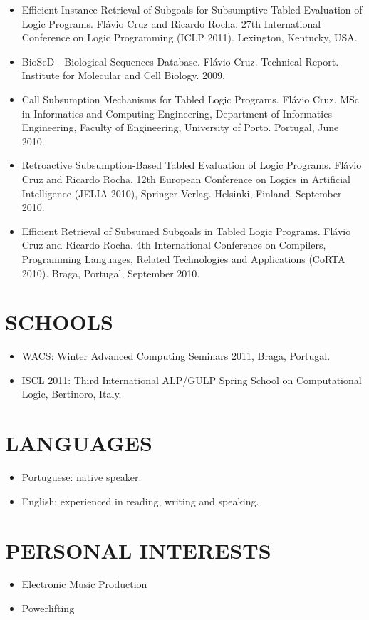 \documentclass[margin]{res}
\begin{document}
\begin{resume}
\begin{itemize}
      \item Efficient Instance Retrieval of Subgoals for Subsumptive Tabled Evaluation of Logic Programs. Flávio Cruz and Ricardo Rocha. 27th International Conference on Logic Programming (ICLP 2011). Lexington, Kentucky, USA.
      \item BioSeD - Biological Sequences Database. Flávio Cruz. Technical Report. Institute for Molecular and Cell Biology. 2009.
      \item Call Subsumption Mechanisms for Tabled Logic Programs. Flávio Cruz. MSc in Informatics and Computing Engineering, Department of Informatics Engineering, Faculty of Engineering, University of Porto. Portugal, June 2010.
      \item Retroactive Subsumption-Based Tabled Evaluation of Logic Programs.
      Flávio Cruz and Ricardo Rocha. 12th European Conference on Logics in Artificial Intelligence (JELIA 2010), Springer-Verlag. Helsinki, Finland, September 2010.
      \item Efficient Retrieval of Subsumed Subgoals in Tabled Logic Programs.
      Flávio Cruz and Ricardo Rocha. 4th International Conference on Compilers, Programming Languages, Related Technologies and Applications (CoRTA 2010). Braga, Portugal, September 2010.
   \end{itemize}

\newpage
   
\section{SCHOOLS}
   \begin{itemize}
      \item WACS: Winter Advanced Computing Seminars 2011, Braga, Portugal.
      \item ISCL 2011: Third International ALP/GULP Spring School on Computational Logic, Bertinoro, Italy.
   \end{itemize}

\section{LANGUAGES}
      \begin{itemize}
        \item Portuguese: native speaker.
        \item English: experienced in reading, writing and speaking.
      \end{itemize}

\section{PERSONAL INTERESTS}

   \begin{itemize}
      \item Electronic Music Production
      \item Powerlifting
   \end{itemize}

\end{resume}
\end{document}
